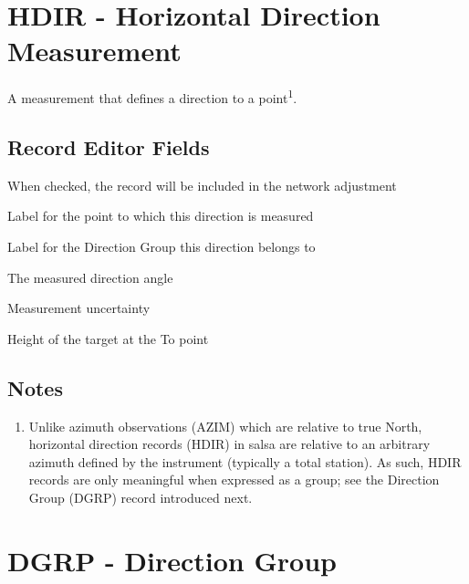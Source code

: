 \newpage
\section{HDIR - Horizontal Direction Measurement}

A measurement that defines a direction to a point\textsuperscript{1}.

\subsection*{Record Editor Fields}

\begin{description}[leftmargin=!,labelwidth=\widthof{\bfseries Height To:}]
\item[Enabled:] When checked, the record will be included in the network adjustment
\item[To Point:] Label for the point to which this direction is measured
\item[Dir Group:] Label for the Direction Group this direction belongs to
\item[Angle:] The measured direction angle
\item[Sigma:] Measurement uncertainty
\item[Height To:] Height of the target at the To point
\end{description}

\subsection*{Notes}
\begin{enumerate}
\item Unlike azimuth observations (AZIM) which are relative to true North, horizontal direction records (HDIR) in \textsf{salsa} are relative to an arbitrary azimuth defined by the instrument (typically a total station).  As such, HDIR records are only meaningful when expressed as a group; see the Direction Group (DGRP) record introduced next.
\end{enumerate}


\newpage
\section{DGRP - Direction Group}

